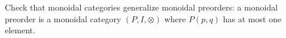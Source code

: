 
Check that monoidal categories generalize monoidal preorders: a monoidal preorder is a monoidal category $(P,I,\otimes)$ where $P(p,q)$ has at most one element.